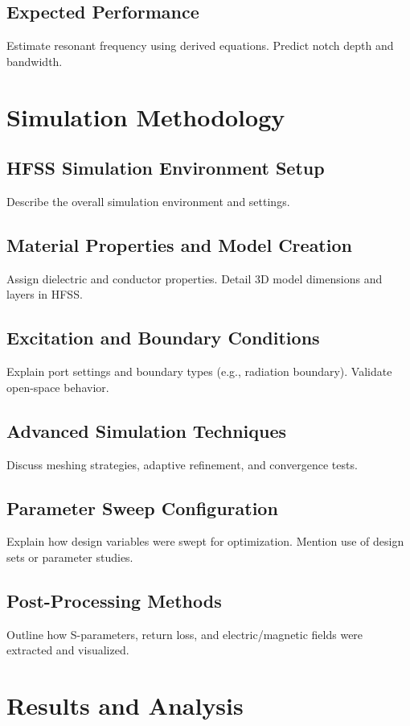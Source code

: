 \documentclass[conference]{IEEEtran}
\begin{document}
\subsection{Expected Performance}
Estimate resonant frequency using derived equations. Predict notch depth and bandwidth.

\section{Simulation Methodology}

\subsection{HFSS Simulation Environment Setup}
Describe the overall simulation environment and settings.

\subsection{Material Properties and Model Creation}
Assign dielectric and conductor properties. Detail 3D model dimensions and layers in HFSS.

\subsection{Excitation and Boundary Conditions}
Explain port settings and boundary types (e.g., radiation boundary). Validate open-space behavior.

\subsection{Advanced Simulation Techniques}
Discuss meshing strategies, adaptive refinement, and convergence tests.

\subsection{Parameter Sweep Configuration}
Explain how design variables were swept for optimization. Mention use of design sets or parameter studies.

\subsection{Post-Processing Methods}
Outline how S-parameters, return loss, and electric/magnetic fields were extracted and visualized.

\section{Results and Analysis}
\end{document}
